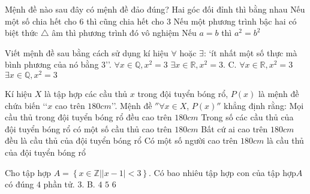 \begin{ex}
	Mệnh đề nào sau đây có mệnh đề đảo đúng?
	\choice
	{Hai góc đối đỉnh thì bằng nhau}
	{Nếu một số chia hết cho 6 thì cũng chia hết cho 3}
	{\True Nếu một phương trình bậc hai có biệt thức $\triangle $ âm thì phương trình đó vô nghiệm}
	{Nếu $a=b$ thì $a^2=b^2$}
\end{ex}
\begin{ex}
	Viết mệnh đề sau bằng cách sử dụng kí hiệu $\forall $ hoặc $\exists $: \lq{} ít nhất một số thực mà bình phương của nó bằng 3\rq\rq.
	\choice
	{$\forall x\in \mathbb{Q},x^2=3$}
	{\True $\exists x\in \mathbb{R},x^2=3$. C. $\forall x\in \mathbb{R},x^2=3$}
	{$\exists x\in \mathbb{Q},x^2=3$}
\end{ex}
\begin{ex}
	Kí hiệu $X$ là tập hợp các cầu thủ $x$ trong đội tuyển bóng rổ, $P(x)$ là mệnh đề chứa biến \lq\lq$x$ cao trên $180 cm$\rq\rq. Mệnh đề $''\forall x\in X$, $P(x)''$ khẳng định rằng:
	\choice
	{\True Mọi cầu thủ trong đội tuyển bóng rổ đều cao trên $180 cm$}
	{Trong số các cầu thủ của đội tuyển bóng rổ có một số cầu thủ cao trên $180 cm$}
	{Bất cứ ai cao trên $180 cm$ đều là cầu thủ của đội tuyển bóng rổ}
	{Có một số người cao trên $180 cm$ là cầu thủ của đội tuyển bóng rổ}
\end{ex}
\begin{ex}
	Cho tập hợp $A=\left\{ x\in \mathbb{Z}\left| |x-1|<3 \right. \right\}$. Có bao nhiêu tập hợp con của tập hợp$A$ có đúng $4$ phần tử.
	\choice
	{$3$. B. $4$}
	{\True $5$}
	{$6$}
\end{ex}
